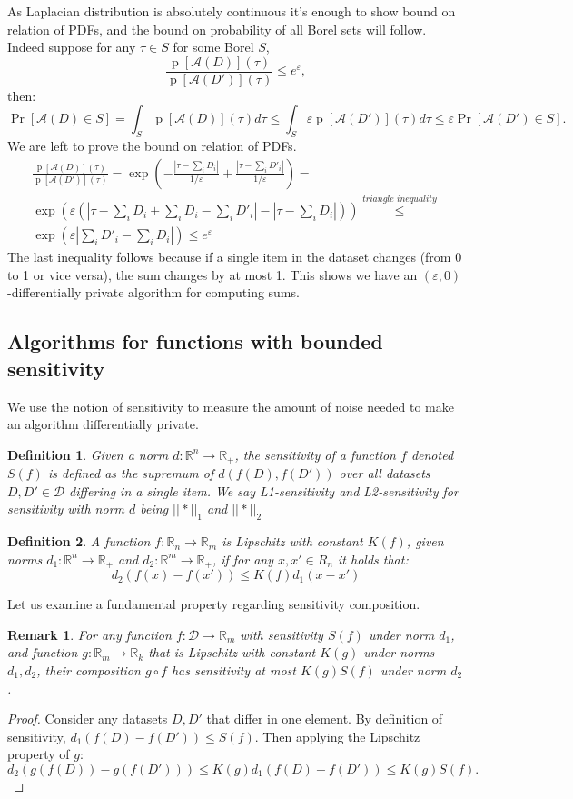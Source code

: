 \documentclass[12pt,letterpaper]{article}
\newcommand{\R}{\mathbb{R}}
\let\eps\varepsilon
\newcommand{\p}{\operatorname{p}}
\newtheorem{definition}{Definition}
\newtheorem{remark}{Remark}
\begin{document}
As Laplacian distribution is absolutely continuous it's enough to show bound on relation of PDFs, and the bound on probability of all Borel sets will follow. Indeed
suppose for any $\tau \in S$ for some Borel $S$,
$$\frac{\p[\mathcal{A}(D)](\tau)}{\p[\mathcal{A}(D')](\tau)} \leq e^\eps,$$
then:
$$\Pr[\mathcal{A}(D) \in S] = \int_{S}\p[\mathcal{A}(D)](\tau)d\tau \leq \int_{S}\eps \p[\mathcal{A}(D')](\tau)d\tau \leq \eps \Pr[\mathcal{A}(D') \in S].$$
We are left to prove the bound on relation of PDFs.
\begin{multline*}
\frac{\p[\mathcal{A}(D)](\tau)}{\p[\mathcal{A}(D')](\tau)} = 
\exp\left(-\frac{|\tau - \sum_iD_i|}{1/\eps} + \frac{|\tau - \sum_iD'_i|}{1/\eps}\right) = \\
\exp\left(\eps(|\tau - \sum_iD_i + \sum_iD_i - \sum_iD'_i| - |\tau - \sum_iD_i|)\right) \overset{\textit{triangle inequality}}{\leq} \\
\exp\left(\eps|\sum_iD'_i - \sum_iD_i|\right) \leq e^{\eps}
\end{multline*}
The last inequality follows because if a single item in the dataset changes (from 0 to 1 or vice versa), the sum changes by at most 1. This shows we have an $(\eps, 0)$-differentially private algorithm for computing sums.

\subsection{Algorithms for functions with bounded sensitivity}
We use the notion of sensitivity to measure the amount of noise needed to make an algorithm differentially private.

\begin{definition}
Given a norm $d: \R^n \to \R_+$, the sensitivity of a function $f$ denoted $S(f)$ is defined as the supremum of $d(f(D), f(D'))$ over all datasets $D, D' \in \mathcal{D}$ differing in a single item. We say L1-sensitivity and L2-sensitivity for sensitivity with norm $d$ being $||*||_1$ and $||*||_2$
\end{definition}

\begin{definition}
  A function $f: \R_n \to \R_m$ is Lipschitz with constant $K(f)$, given norms $d_1: \R^n \to \R_+$ and $d_2: \R^m \to \R_+$, if for any $x, x' \in R_n$ it holds that:
  $$
  d_2(f(x) - f(x')) \leq K(f)d_1(x - x')
  $$
\end{definition}

Let us examine a fundamental property regarding sensitivity composition.
\begin{remark}
  \label{rm:lipschitz}
For any function $f: \mathcal{D} \to \R_m$ with sensitivity $S(f)$ under norm $d_1$, and function $g: \R_m \to \R_k$ that is Lipschitz with constant $K(g)$ under norms $d_1,d_2$, their composition $g \circ f$ has sensitivity at most $K(g)S(f)$ under norm $d_2$.
\end{remark}
\begin{proof}
  Consider any datasets $D, D'$ that differ in one element. By definition of sensitivity, $d_1(f(D) - f(D')) \leq S(f)$. Then applying the Lipschitz property of $g$:
  $$d_2(g(f(D)) - g(f(D'))) \leq K(g)d_1(f(D) - f(D')) \leq K(g)S(f).$$
\end{proof}
\end{document}

